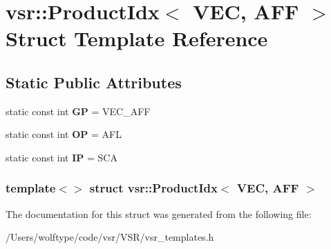 \hypertarget{structvsr_1_1_product_idx_3_01_v_e_c_00_01_a_f_f_01_4}{\section{vsr\-:\-:Product\-Idx$<$ V\-E\-C, A\-F\-F $>$ Struct Template Reference}
\label{structvsr_1_1_product_idx_3_01_v_e_c_00_01_a_f_f_01_4}
}
\subsection*{Static Public Attributes}
\begin{DoxyCompactItemize}
\item 
\hypertarget{structvsr_1_1_product_idx_3_01_v_e_c_00_01_a_f_f_01_4_a0e19de65fc32b12fd3f494ef98165963}{static const int {\bfseries G\-P} = V\-E\-C\-\_\-\-A\-F\-F}\label{structvsr_1_1_product_idx_3_01_v_e_c_00_01_a_f_f_01_4_a0e19de65fc32b12fd3f494ef98165963}

\item 
\hypertarget{structvsr_1_1_product_idx_3_01_v_e_c_00_01_a_f_f_01_4_a62184c5b7f269fda6534140d91147ed3}{static const int {\bfseries O\-P} = A\-F\-L}\label{structvsr_1_1_product_idx_3_01_v_e_c_00_01_a_f_f_01_4_a62184c5b7f269fda6534140d91147ed3}

\item 
\hypertarget{structvsr_1_1_product_idx_3_01_v_e_c_00_01_a_f_f_01_4_a865802aab4001ba7840a1c4e77eaea8b}{static const int {\bfseries I\-P} = S\-C\-A}\label{structvsr_1_1_product_idx_3_01_v_e_c_00_01_a_f_f_01_4_a865802aab4001ba7840a1c4e77eaea8b}

\end{DoxyCompactItemize}
\subsubsection*{template$<$$>$ struct vsr\-::\-Product\-Idx$<$ V\-E\-C, A\-F\-F $>$}



The documentation for this struct was generated from the following file\-:\begin{DoxyCompactItemize}
\item 
/\-Users/wolftype/code/vsr/\-V\-S\-R/vsr\-\_\-templates.\-h\end{DoxyCompactItemize}
